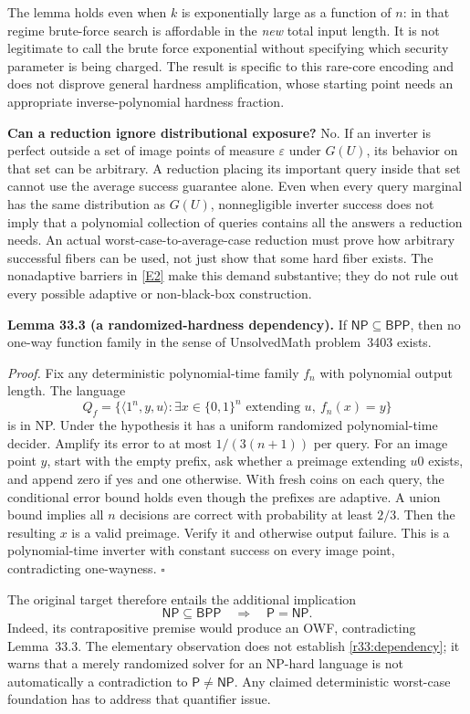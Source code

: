 \documentclass[11pt,a4paper]{article}
\newcommand{\eref}[2]{\hyperlink{extra:#1:#2}{[E#2]}}
\numberwithin{equation}{section}
\begin{document}
The lemma holds even when $k$ is exponentially large as a function of $n$:
in that regime brute-force search is affordable in the \emph{new} total
input length. It is not legitimate to call the brute force exponential
without specifying which security parameter is being charged. The result
is specific to this rare-core encoding and does not disprove general
hardness amplification, whose starting point needs an appropriate
inverse-polynomial hardness fraction.

\medskip
\textbf{Can a reduction ignore distributional exposure?}
No. If an inverter is perfect outside a set of image points of measure
$\varepsilon$ under $G(U)$, its behavior on that set can be arbitrary.
A reduction placing its important query inside that set cannot use the
average success guarantee alone. Even when every query marginal has the
same distribution as $G(U)$, nonnegligible inverter success does not imply
that a polynomial collection of queries contains all the answers a
reduction needs. An actual worst-case-to-average-case reduction must prove
how arbitrary successful fibers can be used, not just show that some hard
fiber exists. The nonadaptive barriers in \eref{30006686}{2} make this demand
substantive; they do not rule out every possible adaptive or non-black-box
construction.

\medskip
\textbf{Lemma 33.3 (a randomized-hardness dependency).}
If $\mathsf{NP}\subseteq\mathsf{BPP}$, then no one-way function family in
the sense of UnsolvedMath problem~3403 exists.

\emph{Proof.} Fix any deterministic polynomial-time family $f_n$ with
polynomial output length. The language
\[
 Q_f=\{\langle1^n,y,u\rangle:
       \exists x\in\{0,1\}^n\text{ extending }u,\ f_n(x)=y\}
\]
is in NP. Under the hypothesis it has a uniform randomized polynomial-time
decider. Amplify its error to at most $1/(3(n+1))$ per query. For an image
point $y$, start with the empty prefix, ask whether a preimage extending
$u0$ exists, and append zero if yes and one otherwise. With fresh coins on
each query, the conditional error bound holds even though the prefixes
are adaptive. A union bound implies all $n$ decisions are correct with
probability at least $2/3$. Then the resulting $x$ is a valid preimage.
Verify it and otherwise output failure. This is a polynomial-time inverter
with constant success on every image point, contradicting one-wayness.
\hfill$\square$

The original target therefore entails the additional implication
\begin{equation}\label{r33:dependency}
 \mathsf{NP}\subseteq\mathsf{BPP}\quad\Longrightarrow\quad
                      \mathsf P=\mathsf{NP}.
\end{equation}
Indeed, its contrapositive premise would produce an OWF, contradicting
Lemma~33.3. The elementary observation does not establish
\eqref{r33:dependency}; it warns that a merely randomized solver for an
NP-hard language is not automatically a contradiction to
$\mathsf P\ne\mathsf{NP}$. Any claimed deterministic worst-case foundation
has to address that quantifier issue.
\end{document}
